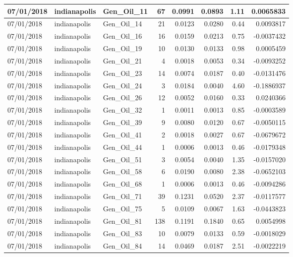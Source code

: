 \documentclass[
  letterpaper,
  DIV=11,
  numbers=noendperiod]{scrartcl}
\begin{document}
\begin{tabular}{l|l|l|r|r|r|r|r}
\hline
07/01/2018 & indianapolis & Gen\_Oil\_11 & 67 & 0.0991 & 0.0893 & 1.11 & 0.0065833\\
\hline
07/01/2018 & indianapolis & Gen\_Oil\_14 & 21 & 0.0123 & 0.0280 & 0.44 & 0.0093817\\
\hline
07/01/2018 & indianapolis & Gen\_Oil\_16 & 16 & 0.0159 & 0.0213 & 0.75 & -0.0037432\\
\hline
07/01/2018 & indianapolis & Gen\_Oil\_19 & 10 & 0.0130 & 0.0133 & 0.98 & 0.0005459\\
\hline
07/01/2018 & indianapolis & Gen\_Oil\_21 & 4 & 0.0018 & 0.0053 & 0.34 & -0.0093252\\
\hline
07/01/2018 & indianapolis & Gen\_Oil\_23 & 14 & 0.0074 & 0.0187 & 0.40 & -0.0131476\\
\hline
07/01/2018 & indianapolis & Gen\_Oil\_24 & 3 & 0.0184 & 0.0040 & 4.60 & -0.1886937\\
\hline
07/01/2018 & indianapolis & Gen\_Oil\_26 & 12 & 0.0052 & 0.0160 & 0.33 & 0.0240366\\
\hline
07/01/2018 & indianapolis & Gen\_Oil\_32 & 1 & 0.0011 & 0.0013 & 0.85 & -0.0003589\\
\hline
07/01/2018 & indianapolis & Gen\_Oil\_39 & 9 & 0.0080 & 0.0120 & 0.67 & -0.0050115\\
\hline
07/01/2018 & indianapolis & Gen\_Oil\_41 & 2 & 0.0018 & 0.0027 & 0.67 & -0.0679672\\
\hline
07/01/2018 & indianapolis & Gen\_Oil\_44 & 1 & 0.0006 & 0.0013 & 0.46 & -0.0179348\\
\hline
07/01/2018 & indianapolis & Gen\_Oil\_51 & 3 & 0.0054 & 0.0040 & 1.35 & -0.0157020\\
\hline
07/01/2018 & indianapolis & Gen\_Oil\_58 & 6 & 0.0190 & 0.0080 & 2.38 & -0.0652103\\
\hline
07/01/2018 & indianapolis & Gen\_Oil\_68 & 1 & 0.0006 & 0.0013 & 0.46 & -0.0094286\\
\hline
07/01/2018 & indianapolis & Gen\_Oil\_71 & 39 & 0.1231 & 0.0520 & 2.37 & -0.0117577\\
\hline
07/01/2018 & indianapolis & Gen\_Oil\_75 & 5 & 0.0109 & 0.0067 & 1.63 & -0.0443823\\
\hline
07/01/2018 & indianapolis & Gen\_Oil\_81 & 138 & 0.1191 & 0.1840 & 0.65 & 0.0054998\\
\hline
07/01/2018 & indianapolis & Gen\_Oil\_83 & 10 & 0.0079 & 0.0133 & 0.59 & -0.0018029\\
\hline
07/01/2018 & indianapolis & Gen\_Oil\_84 & 14 & 0.0469 & 0.0187 & 2.51 & -0.0022219\\

\end{tabular}
\end{document}
